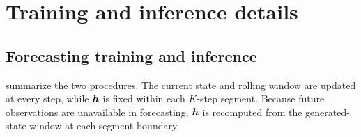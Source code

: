 



\clearpage
\section{Training and inference details}

\subsection{Forecasting training and inference}
\label{sec:vsf-forecasting}
 summarize the two procedures.
The current state and rolling window
are updated at every step, while ${\bm{h}}$ is fixed within each $K$-step segment.
Because future observations are unavailable in forecasting, ${\bm{h}}$ is
recomputed from the generated-state window at each segment boundary.

